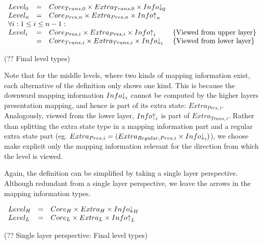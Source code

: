 \begin{small}\begin{align*}%
\end{align*} 
\(\begin{array}{lcll}
Level_{0} & = & Core_{Trans,0} \times Extra_{Trans,0} \times Info\idwn_{0} \\
Level_{n} & = & Core_{Pres,n} \times Extra_{Pres,n} \times  Info\iup_{n}\\
\lefteqn{\forall i:1 \le i \le n-1:}  \\
Level_{i} & = & Core_{Pres,i} \times Extra_{Pres,i}  \times Info\iup_{i} & \text{\{Viewed from upper layer\}}\\  
               & = & Core_{Trans,i} \times Extra_{Trans,i} \times Info\idwn_{i} & \text{\{Viewed from lower layer\}}
\end{array}\)\end{small}
\begin{center}(?? Final level types)\end{center}\vspace{1em}

Note that for the middle levels, where two kinds of mapping information exist, each alternative of the definition only shows one kind. This is because the downward mapping information $Info\idwn_{i}$ cannot be computed by the higher layers presentation mapping, and hence is part of its extra state: $Extra_{Pres,i}$. Analogously, viewed from the lower layer, $Info\iup_{i}$ is part of $Extra_{Trans,i}$. Rather than splitting the extra state type in a mapping information part and a regular extra state part (eg. $Extra_{Pres,i} = (Extra_{Regular,Pres,i} \times Info\idwn_{i})$), we choose make explicit only the mapping information relevant for the direction from which the level is viewed.

Again, the definition can be simplified by taking a single layer perspective. Although redundant from a single layer perspective, we leave the arrows in the mapping information types.

\begin{small}\(\begin{array}{lcll} \label{inv:extraStateSL}
Level_{H} & = & Core_{H} \times Extra_{H} \times Info\idwn_{H}\\
Level_{L} & = & Core_{L} \times Extra_{L} \times Info\iup_{L}\\
\end{array}\)\end{small}
\begin{center}(?? Single layer perspective: Final level types)\end{center}\vspace{1em}

